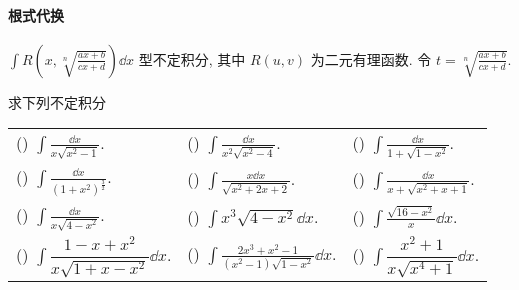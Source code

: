 \paragraph{根式代换}
$\displaystyle \int R\left(x, \sqrt[n]{\frac{a x+b}{c x+d}}\right) \dd  x $ 型不定积分, 
其中 $ R(u, v) $ 为二元有理函数. 令 $\displaystyle t=\sqrt[n]{\frac{a x+b}{c x+d}} .$
\begin{example}
    求下列不定积分
    \setcounter{magicrownumbers}{0}
    \begin{table}[H]
        \centering
        \begin{tabular}{l | l | l}
            (\rownumber{}) $\displaystyle\int\frac{\dd x}{x\sqrt{x^2-1}}.$                    & (\rownumber{}) $\displaystyle\int\frac{\dd x}{x^2\sqrt{x^2-4}}.$                          & (\rownumber{}) $\displaystyle\int\frac{\dd x}{1+\sqrt{1-x^2}}.$      \\
            (\rownumber{}) $\displaystyle\int\frac{\dd x}{\left(1+x^2\right)^{\frac{3}{2}}}.$ & (\rownumber{}) $\displaystyle\int\frac{x\dd x}{\sqrt{x^2+2x+2}}.$                         & (\rownumber{}) $\displaystyle\int\frac{\dd x}{x+\sqrt{x^2+x+1}}.$    \\
            (\rownumber{}) $\displaystyle\int\frac{\dd x}{x\sqrt{4-x^2}}.$                    & (\rownumber{}) $\displaystyle\int x^3\sqrt{4-x^2}\dd x.$                                  & (\rownumber{}) $\displaystyle\int\frac{\sqrt{16-x^2}}{x}\dd x.$      \\
            (\rownumber{}) $\displaystyle\int\dfrac{1-x+x^2}{x\sqrt{1+x-x^2}}\dd x.$          & (\rownumber{}) $\displaystyle\int\frac{2x^3+x^2-1}{\left(x^2-1\right)\sqrt{1-x^2}}\dd x.$ & (\rownumber{}) $\displaystyle\int\dfrac{x^2+1}{x\sqrt{x^4+1}}\dd x.$
        \end{tabular}
    \end{table}
\end{example}
